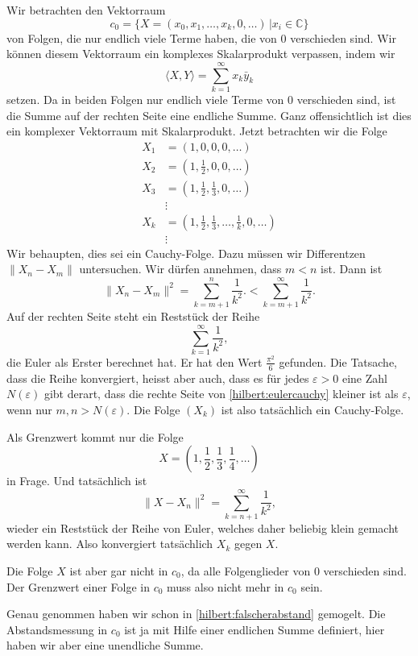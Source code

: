 \begin{beispiel}
Wir betrachten den Vektorraum
\[
c_0 = \{ X=(x_0, x_1, \dots ,x_k,0,\dots)\,| x_i \in \mathbb C\}
\]
von Folgen, die nur endlich viele Terme haben, die von $0$ verschieden sind.
Wir können diesem Vektorraum ein komplexes Skalarprodukt verpassen, indem wir
\[
\langle X,Y\rangle
=
\sum_{k=1}^\infty x_k\bar{y}_k
\]
setzen.
Da in beiden Folgen nur endlich viele Terme von $0$ verschieden sind, ist
die Summe auf der rechten Seite eine endliche Summe.
Ganz offensichtlich ist dies ein komplexer Vektorraum mit Skalarprodukt.
Jetzt betrachten wir die Folge
\begin{align*}
X_1 &= (1,0,0,0,\dots)
\\
X_2 &= \textstyle (1,\frac12,0,0,\dots)
\\
X_3 &= \textstyle (1,\frac12,\frac13,0,\dots)
\\
&\vdots
\\
X_k &= \textstyle (1,\frac12,\frac13,\dots,\frac1k,0,\dots)
\\
&\vdots
\end{align*}
Wir behaupten, dies sei ein Cauchy-Folge.
Dazu müssen wir Differentzen $\| X_n-X_m\|$ untersuchen.
Wir dürfen annehmen, dass $m < n$ ist.
Dann ist
\begin{equation}
\| X_n - X_m\|^2 = \sum_{k=m+1}^n \frac{1}{k^2}.
<
\sum_{k=m+1}^\infty \frac{1}{k^2}.
\label{hilbert:eulercauchy}
\end{equation}
Auf der rechten Seite steht ein Reststück der Reihe
\[
\sum_{k=1}^\infty \frac{1}{k^2},
\]
die Euler als Erster berechnet hat.
%
Er hat den Wert $\frac{\pi^2}{6}$ gefunden.
Die Tatsache, dass die Reihe konvergiert, heisst aber auch, dass
es für jedes $\varepsilon >0$ eine Zahl $N(\varepsilon)$ gibt derart,
dass die rechte Seite von \eqref{hilbert:eulercauchy} kleiner ist
als $\varepsilon$, wenn nur $m,n>N(\varepsilon)$.
Die Folge $(X_k)$ ist also tatsächlich ein Cauchy-Folge.

Als Grenzwert kommt nur die Folge 
\[
X = \textstyle (1,\frac12, \frac13,\frac14,\dots)
\]
in Frage.
Und tatsächlich ist
\begin{equation}
\|X-X_n\|^2
=
\sum_{k=n+1}^\infty \frac1{k^2},
\label{hilbert:falscherabstand}
\end{equation}
wieder ein Reststück der Reihe von Euler, welches daher beliebig klein
gemacht werden kann.
Also konvergiert tatsächlich $X_k$ gegen $X$.

Die Folge $X$ ist aber gar nicht in $c_0$,
da alle Folgenglieder von $0$ verschieden sind.
Der Grenzwert einer Folge in $c_0$ muss also nicht mehr in $c_0$ sein.

Genau genommen haben wir schon in \eqref{hilbert:falscherabstand}
gemogelt.
Die Abstandsmessung in $c_0$ ist ja mit Hilfe einer endlichen Summe
definiert, hier haben wir aber eine unendliche Summe.
\end{beispiel}

